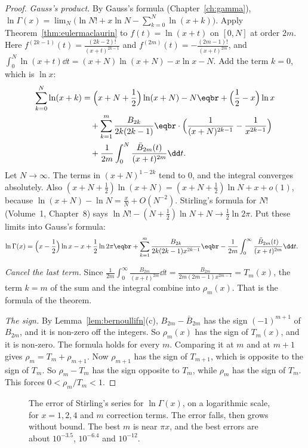 \begin{proof}
\emph{Gauss's product.} By Gauss's formula (Chapter~\ref{ch:gamma}), $\ln\Gamma(x)=\lim_N\bigl(\ln N!+x\ln N-\sum_{k=0}^N\ln(x+k)\bigr)$. Apply Theorem~\ref{thm:eulermaclaurin} to $f(t)=\ln(x+t)$ on $[0,N]$ at order $2m$. Here $f^{(2k-1)}(t)=\frac{(2k-2)!}{(x+t)^{2k-1}}$ and $f^{(2m)}(t)=-\frac{(2m-1)!}{(x+t)^{2m}}$, and $\int_0^N\ln(x+t)\dd t=(x+N)\ln(x+N)-x\ln x-N$. Add the term $k=0$, which is $\ln x$:
\[
\begin{aligned}\sum_{k=0}^N\ln(x+k)&=\Bigl(x+N+\frac12\Bigr)\ln(x+N)-N\eqbr+\Bigl(\frac12-x\Bigr)\ln x\\
&\quad+\sum_{k=1}^m\frac{B_{2k}}{2k(2k-1)}\eqbr\cdot\Bigl(\frac1{(x+N)^{2k-1}}-\frac1{x^{2k-1}}\Bigr)\\
&\quad+\frac1{2m}\int_0^N\frac{\bar B_{2m}(t)}{(x+t)^{2m}}\dd t.\end{aligned}
\]
Let $N\to\infty$. The terms in $(x+N)^{1-2k}$ tend to $0$, and the integral converges absolutely. Also $(x+N+\frac12)\ln(x+N)=(x+N+\frac12)\ln N+x+o(1)$, because $\ln(x+N)-\ln N=\frac xN+O(N^{-2})$. Stirling's formula for $N!$ (Volume~1, Chapter~8) says $\ln N!-(N+\frac12)\ln N+N\to\frac12\ln2\pi$. Put these limits into Gauss's formula:
\[
\begin{aligned}\ln\Gamma(x)&=\Bigl(x-\frac12\Bigr)\ln x-x+\frac12\ln2\pi\eqbr+\sum_{k=1}^m\frac{B_{2k}}{2k(2k-1)x^{2k-1}}\eqbr-\frac1{2m}\int_0^\infty\frac{\bar B_{2m}(t)}{(x+t)^{2m}}\dd t.\end{aligned}
\]

\emph{Cancel the last term.} Since $\frac1{2m}\int_0^\infty\frac{B_{2m}}{(x+t)^{2m}}\dd t=\frac{B_{2m}}{2m(2m-1)x^{2m-1}}=T_m(x)$, the term $k=m$ of the sum and the integral combine into $\rho_m(x)$. That is the formula of the theorem.

\emph{The sign.} By Lemma~\ref{lem:bernoullifn}(c), $B_{2m}-\bar B_{2m}$ has the sign $(-1)^{m+1}$ of $B_{2m}$, and it is non-zero off the integers. So $\rho_m(x)$ has the sign of $T_m(x)$, and it is non-zero. The formula holds for every $m$. Comparing it at $m$ and at $m+1$ gives $\rho_m=T_m+\rho_{m+1}$. Now $\rho_{m+1}$ has the sign of $T_{m+1}$, which is opposite to the sign of $T_m$. So $\rho_m-T_m$ has the sign opposite to $T_m$, while $\rho_m$ has the sign of $T_m$. This forces $0<\rho_m/T_m<1$.
\end{proof}

\begin{figure}[ht]
\centering
{}
\caption{The error of Stirling's series for $\ln\Gamma(x)$, on a logarithmic scale, for $x=1,2,4$ and $m$ correction terms. The error falls, then grows without bound. The best $m$ is near $\pi x$, and the best errors are about $10^{-3.5}$, $10^{-6.4}$ and $10^{-12}$.}
\label{fig:stirlingerr}
\end{figure}

